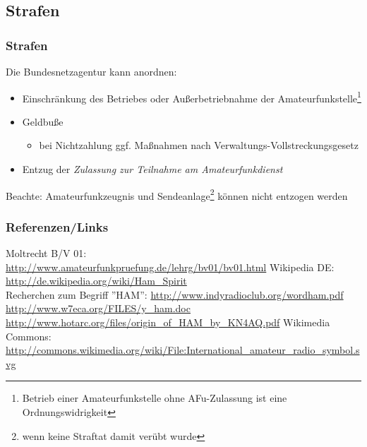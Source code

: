 \subsection{Strafen}

\begin{frame}
    \frametitle{Strafen}

    Die Bundesnetzagentur kann anordnen:

    \begin{itemize}
        \item Einschränkung des Betriebes oder Außerbetriebnahme der
              Amateurfunkstelle\footnote{Betrieb einer Amateurfunkstelle ohne
              AFu-Zulassung ist eine Ordnungswidrigkeit}
        \item Geldbuße
        \begin{itemize}
            \item bei Nichtzahlung ggf. Maßnahmen nach Verwaltungs-Vollstreckungsgesetz
        \end{itemize}
        \item Entzug der \emph{Zulassung zur Teilnahme am Amateurfunkdienst}
    \end{itemize}

    \vspace{1em}

    Beachte: Amateurfunkzeugnis und Sendeanlage\footnote{wenn keine Straftat
    damit verübt wurde} können nicht entzogen werden

\end{frame}

\renewcommand{\refname}{Referenzen}

\begin{frame}
    \frametitle{Referenzen/Links}
    \hypertarget{refs}{}
    \footnotesize

    \begin{thebibliography}{}
         Moltrecht B/V 01: \\
                        \url{http://www.amateurfunkpruefung.de/lehrg/bv01/bv01.html}
            Wikipedia DE: \\
                        \url{http://de.wikipedia.org/wiki/Ham_Spirit} \\
           Recherchen zum Begriff ''HAM'':
                        \url{http://www.indyradioclub.org/wordham.pdf} \\
                        \url{http://www.w7eca.org/FILES/y_ham.doc} \\
                        \url{http://www.hotarc.org/files/origin_of_HAM_by_KN4AQ.pdf}
            Wikimedia Commons: \\
                        \url{http://commons.wikimedia.org/wiki/File:International_amateur_radio_symbol.svg}
    \end{thebibliography} 
   
\end{frame}


